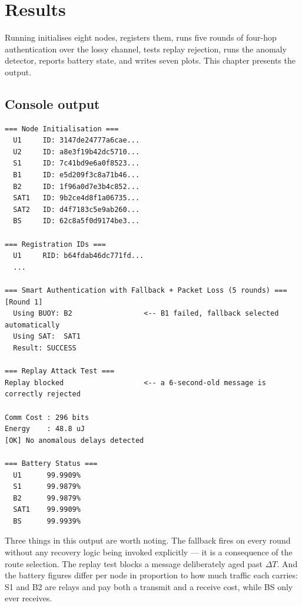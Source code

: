 \chapter{Results}
\label{ch:results}

Running  initialises eight nodes, registers them, runs five
rounds of four-hop authentication over the lossy channel, tests replay rejection, runs the
anomaly detector, reports battery state, and writes seven plots. This chapter presents the
output.

\section{Console output}

\begin{lstlisting}[style=plain,caption={Representative run. Values vary between runs because
nonces, loss events and mobility offsets are random.}]
=== Node Initialisation ===
  U1     ID: 3147de24777a6cae...
  U2     ID: a8e3f19b42dc5710...
  S1     ID: 7c41bd9e6a0f8523...
  B1     ID: e5d209f3c8a71b46...
  B2     ID: 1f96a0d7e3b4c852...
  SAT1   ID: 9b2ce4d8f1a06735...
  SAT2   ID: d4f7183c5e9ab260...
  BS     ID: 62c8a5f0d9174be3...

=== Registration IDs ===
  U1     RID: b64fdab46dc771fd...
  ...

=== Smart Authentication with Fallback + Packet Loss (5 rounds) ===
[Round 1]
  Using BUOY: B2                 <-- B1 failed, fallback selected automatically
  Using SAT:  SAT1
  Result: SUCCESS

=== Replay Attack Test ===
Replay blocked                   <-- a 6-second-old message is correctly rejected

Comm Cost : 296 bits
Energy    : 48.8 uJ
[OK] No anomalous delays detected

=== Battery Status ===
  U1      99.9909%
  S1      99.9879%
  B2      99.9879%
  SAT1    99.9909%
  BS      99.9939%
\end{lstlisting}

Three things in this output are worth noting. The fallback fires on every round without any
recovery logic being invoked explicitly --- it is a consequence of the route selection.
The replay test blocks a message deliberately aged past $\Delta T$. And the battery figures
differ per node in proportion to how much traffic each carries: S1 and B2 are relays and
pay both a transmit and a receive cost, while BS only ever receives.

